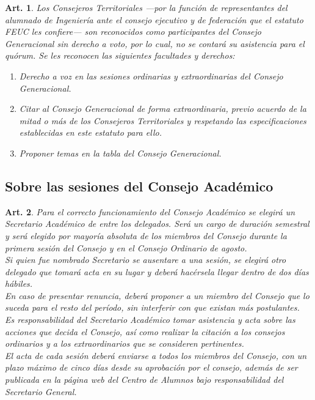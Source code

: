 \documentclass[letterpaper,11pt]{article}
\theoremstyle{plain}
\newtheorem{art}{Art.} %
\begin{document}
			\begin{art}
				Los Consejeros Territoriales ---por la función de representantes del alumnado de Ingeniería ante el consejo ejecutivo y de federación que el estatuto FEUC les confiere--- son reconocidos como participantes del Consejo Generacional sin derecho a voto, por lo cual, no se contará su asistencia para el quórum. Se les reconocen las siguientes facultades y derechos:
				\begin{enumerate}
					\item Derecho a voz en las sesiones ordinarias y extraordinarias del Consejo Generacional.
					\item Citar al Consejo Generacional de forma extraordinaria, previo acuerdo de la mitad o más de los Consejeros Territoriales y respetando las especificaciones establecidas en este estatuto para ello.
					\item Proponer temas en la tabla del Consejo Generacional.
				\end{enumerate}
			\end{art}

		\subsection*{Sobre las sesiones del Consejo Académico}


			\begin{art}
				Para el correcto funcionamiento del Consejo Académico se elegirá un Secretario Académico de entre los delegados. Será un cargo de duración semestral y será elegido por mayoría absoluta de los miembros del Consejo durante la primera sesión del Consejo  y en el Consejo Ordinario de agosto.
				\\
				Si quien fue nombrado Secretario se ausentare a una sesión, se elegirá otro delegado que tomará acta en su lugar y deberá hacérsela llegar dentro de dos días hábiles.
				\\
				En caso de presentar renuncia, deberá proponer a un miembro del Consejo que lo suceda para el resto del período, sin interferir con que existan más postulantes.
				\\
				Es responsabilidad del Secretario Académico tomar asistencia y acta sobre las acciones que decida el Consejo, así como realizar la citación a los consejos ordinarios y a los extraordinarios que se consideren pertinentes.
				\\
				El acta de cada sesión deberá enviarse a todos los miembros del Consejo, con un plazo máximo de cinco días  desde su aprobación por el consejo, además de ser publicada en la página web del Centro de Alumnos bajo responsabilidad del Secretario General.
			\end{art}
\end{document}
